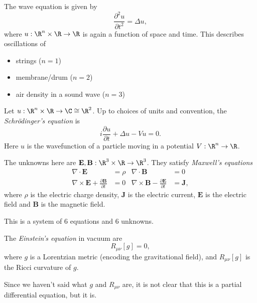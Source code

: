 \documentclass[a4paper]{article}
\begin{document}
\begin{eg}
  The wave equation is given by
  \[
    \frac{\partial^2 u}{\partial t^2} = \Delta u,
  \]
  where $u: \R^n \times \R \to \R$ is again a function of space and time. This describes oscillations of
  \begin{itemize}
    \item strings ($n = 1$)
    \item membrane/drum ($n = 2$)
    \item air density in a sound wave ($n = 3$)
  \end{itemize}
\end{eg}

\begin{eg}
  Let $u: \R^n \times \R \to \C \cong \R^2$. Up to choices of units and convention, the \emph{Schr\"odinger's equation} is
  \[
    i\frac{\partial u}{\partial t} + \Delta u - Vu = 0.
  \]
  Here $u$ is the wavefunction of a particle moving in a potential $V: \R^n \to \R$.
\end{eg}

\begin{eg}
  The unknowns here are $\mathbf{E}, \mathbf{B}: \R^3 \times \R \to \R^3$. They satisfy \emph{Maxwell's equations}
  \begin{align*}
    \nabla \cdot \mathbf{E} &= \rho & \nabla \cdot \mathbf{B} &= 0\\
    \nabla \times \mathbf{E} + \frac{\partial \mathbf{B}}{\partial t} &= 0 & \nabla \times \mathbf{B} - \frac{\partial \mathbf{E}}{\partial t} &= \mathbf{J},
  \end{align*}
  where $\rho$ is the electric charge density, $\mathbf{J}$ is the electric current, $\mathbf{E}$ is the electric field and $\mathbf{B}$ is the magnetic field.

  This is a system of 6 equations and 6 unknowns.
\end{eg}

\begin{eg}
  The \emph{Einstein's equation} in vacuum are
  \[
    R_{\mu\nu}[g] = 0,
  \]
  where $g$ is a Lorentzian metric (encoding the gravitational field), and $R_{\mu\nu}[g]$ is the Ricci curvature of $g$.

  Since we haven't said what $g$ and $R_{\mu\nu}$ are, it is not clear that this is a partial differential equation, but it is.
\end{eg}
\end{document}
